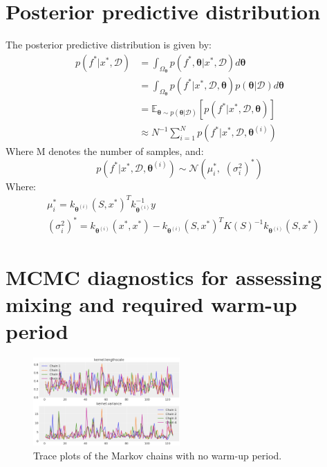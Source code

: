 \begin{appendices}
\section{Posterior predictive distribution}\label{appendix1}
The posterior predictive distribution is given by:
\begin{align}
    p(f^*|x^*,\mathcal{D}) &= \int_{\Omega_{\bm{\theta}}}p(f^*,{\bm{\theta}}|x^*,\mathcal{D})d{\bm{\theta}}\\
    &=\int_{\Omega_{\bm{\theta}}}p(f^*|x^*,\mathcal{D},{\bm{\theta}})p({\bm{\theta}}|\mathcal{D})d{\bm{\theta}}\\
    &=\mathbb{E}_{{\bm{\theta}}\sim p({\bm{\theta}}|\mathcal{D})}\left[p(f^*|x^*,\mathcal{D},{\bm{\theta}})\right]\\
    &\approx N^{-1}\sum_{i=1}^N p(f^*|x^*,\mathcal{D}, {\bm{\theta}}^{(i)})
\end{align}
Where M denotes the number of samples, and:
\begin{equation}
    p(f^*|x^*,\mathcal{D}, {\bm{\theta}}^{(i)}) \sim \mathcal{N}\left(\mu_i^*, \, \, (\sigma_i^2)^*\right)
\end{equation}
Where: 
\begin{align*}
    &\mu_i^*=k_{{\bm{\theta}}^{(i)}}(S,x^*)^Tk_{{\bm{\theta}}^{(i)}}^{-1}y\\
    &(\sigma_i^2)^*=k_{{\bm{\theta}}^{(i)}}(x^*,x^*)-k_{{\bm{\theta}}^{(i)}}(S,x^*)^TK(S)^{-1}k_{{\bm{\theta}}^{(i)}}(S,x^*)
\end{align*}

\section{MCMC diagnostics for assessing mixing and required warm-up period}\label{appendix2}

\begin{figure}[H]
    \centering
    \includegraphics[width=0.5\textwidth]{src/traceplotsdiagnostics.png}
    \caption{Trace plots of the Markov chains with no warm-up period.}
    \label{fig:mcmcdiag}
\end{figure}


\end{appendices}
